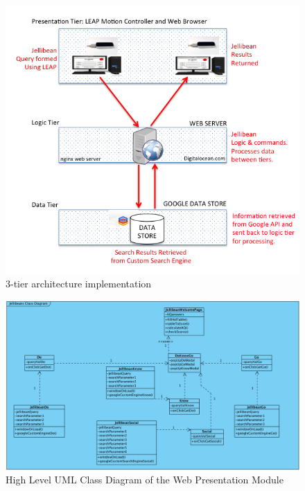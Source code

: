 \documentclass[a4paper, 11pt]{article}
\begin{document}
\begin{figure}[H]
\begin{center}
\includegraphics[scale=0.70]{ntier}
\caption{3-tier architecture implementation}
\label{ntier}
\end{center}
\end{figure}



\begin{figure}[H]
\begin{center}
\includegraphics[scale=0.3]{jBeanClassDiagram}
\caption{High Level UML Class Diagram of the Web Presentation Module}
\label{jBeanClassDiagram}
\end{center}
\end{figure}
\end{document}
